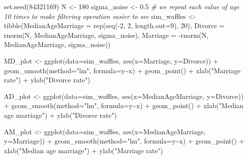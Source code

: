 \documentclass[
]{book}
\newenvironment{Shaded}{\begin{snugshade}}{\end{snugshade}}
\newcommand{\AttributeTok}[1]{\textcolor[rgb]{0.77,0.63,0.00}{#1}}
\newcommand{\CommentTok}[1]{\textcolor[rgb]{0.56,0.35,0.01}{\textit{#1}}}
\newcommand{\DecValTok}[1]{\textcolor[rgb]{0.00,0.00,0.81}{#1}}
\newcommand{\FloatTok}[1]{\textcolor[rgb]{0.00,0.00,0.81}{#1}}
\newcommand{\FunctionTok}[1]{\textcolor[rgb]{0.00,0.00,0.00}{#1}}
\newcommand{\NormalTok}[1]{#1}
\newcommand{\OtherTok}[1]{\textcolor[rgb]{0.56,0.35,0.01}{#1}}
\newcommand{\SpecialCharTok}[1]{\textcolor[rgb]{0.00,0.00,0.00}{#1}}
\newcommand{\StringTok}[1]{\textcolor[rgb]{0.31,0.60,0.02}{#1}}
\begin{document}
\begin{Shaded}
\begin{Highlighting}[]
\FunctionTok{set.seed}\NormalTok{(}\DecValTok{84321169}\NormalTok{)}
\NormalTok{N }\OtherTok{\textless{}{-}} \DecValTok{180}
\NormalTok{sigma\_noise }\OtherTok{\textless{}{-}} \FloatTok{0.5}
\CommentTok{\# we repeat each value of age 10 times to make filtering operation easier to see}
\NormalTok{sim\_waffles }\OtherTok{\textless{}{-}} \FunctionTok{tibble}\NormalTok{(}\AttributeTok{MedianAgeMarriage =} \FunctionTok{rep}\NormalTok{(}\FunctionTok{seq}\NormalTok{(}\SpecialCharTok{{-}}\DecValTok{2}\NormalTok{, }\DecValTok{2}\NormalTok{, }\AttributeTok{length.out=}\DecValTok{9}\NormalTok{), }\DecValTok{20}\NormalTok{), }
                      \AttributeTok{Divorce =} \FunctionTok{rnorm}\NormalTok{(N, MedianAgeMarriage, sigma\_noise),}
                      \AttributeTok{Marriage =} \SpecialCharTok{{-}}\FunctionTok{rnorm}\NormalTok{(N, MedianAgeMarriage, sigma\_noise))}

\NormalTok{MD\_plot }\OtherTok{\textless{}{-}} 
  \FunctionTok{ggplot}\NormalTok{(}\AttributeTok{data=}\NormalTok{sim\_waffles, }\FunctionTok{aes}\NormalTok{(}\AttributeTok{x=}\NormalTok{Marriage, }\AttributeTok{y=}\NormalTok{Divorce)) }\SpecialCharTok{+} 
    \FunctionTok{geom\_smooth}\NormalTok{(}\AttributeTok{method=}\StringTok{"lm"}\NormalTok{, }\AttributeTok{formula=}\NormalTok{y}\SpecialCharTok{\textasciitilde{}}\NormalTok{x) }\SpecialCharTok{+} 
    \FunctionTok{geom\_point}\NormalTok{() }\SpecialCharTok{+} 
    \FunctionTok{xlab}\NormalTok{(}\StringTok{"Marriage rate"}\NormalTok{) }\SpecialCharTok{+} 
    \FunctionTok{ylab}\NormalTok{(}\StringTok{"Divorce rate"}\NormalTok{)}
  
\NormalTok{AD\_plot }\OtherTok{\textless{}{-}} 
  \FunctionTok{ggplot}\NormalTok{(}\AttributeTok{data=}\NormalTok{sim\_waffles, }\FunctionTok{aes}\NormalTok{(}\AttributeTok{x=}\NormalTok{MedianAgeMarriage, }\AttributeTok{y=}\NormalTok{Divorce)) }\SpecialCharTok{+} 
    \FunctionTok{geom\_smooth}\NormalTok{(}\AttributeTok{method=}\StringTok{"lm"}\NormalTok{, }\AttributeTok{formula=}\NormalTok{y}\SpecialCharTok{\textasciitilde{}}\NormalTok{x) }\SpecialCharTok{+} 
    \FunctionTok{geom\_point}\NormalTok{() }\SpecialCharTok{+} 
    \FunctionTok{xlab}\NormalTok{(}\StringTok{"Median age marriage"}\NormalTok{) }\SpecialCharTok{+} 
    \FunctionTok{ylab}\NormalTok{(}\StringTok{"Divorce rate"}\NormalTok{)}
  
\NormalTok{AM\_plot }\OtherTok{\textless{}{-}} 
  \FunctionTok{ggplot}\NormalTok{(}\AttributeTok{data=}\NormalTok{sim\_waffles, }\FunctionTok{aes}\NormalTok{(}\AttributeTok{x=}\NormalTok{MedianAgeMarriage, }\AttributeTok{y=}\NormalTok{Marriage)) }\SpecialCharTok{+} 
    \FunctionTok{geom\_smooth}\NormalTok{(}\AttributeTok{method=}\StringTok{"lm"}\NormalTok{, }\AttributeTok{formula=}\NormalTok{y}\SpecialCharTok{\textasciitilde{}}\NormalTok{x) }\SpecialCharTok{+} 
    \FunctionTok{geom\_point}\NormalTok{() }\SpecialCharTok{+} 
    \FunctionTok{xlab}\NormalTok{(}\StringTok{"Median age marriage"}\NormalTok{) }\SpecialCharTok{+} 
    \FunctionTok{ylab}\NormalTok{(}\StringTok{"Marriage rate"}\NormalTok{)}


\end{Highlighting}
\end{Shaded}
\end{document}
